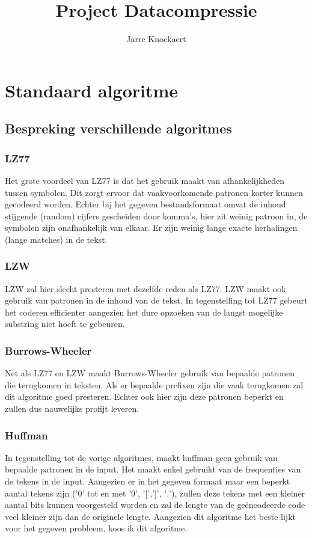 \documentclass[11pt, a4paper]{article}
\begin{document}
	\title{Project Datacompressie}
	\author{Jarre Knockaert}
	\maketitle

\newpage

\section{Standaard algoritme}
\subsection{Bespreking verschillende algoritmes}
\subsubsection{LZ77}
Het grote voordeel van LZ77 is dat het gebruik maakt van afhankelijkheden tussen symbolen. Dit zorgt ervoor dat vaakvoorkomende patronen korter kunnen gecodeerd worden. Echter bij het gegeven bestandsformaat omvat de inhoud stijgende (random) cijfers gescheiden door komma's, hier zit weinig patroon in, de symbolen zijn onafhankelijk van elkaar. Er zijn weinig lange exacte herhalingen (lange matches) in de tekst. 

\subsubsection{LZW}
LZW zal hier slecht presteren met dezelfde reden als LZ77. LZW maakt ook gebruik van patronen in de inhoud van de tekst. In tegenstelling tot LZ77 gebeurt het coderen effic\"{i}enter aangezien het dure opzoeken van de langst mogelijke substring niet hoeft te gebeuren. 

\subsubsection{Burrows-Wheeler}
Net als LZ77 en LZW maakt Burrows-Wheeler gebruik van bepaalde patronen die terugkomen in teksten. Als er bepaalde prefixen zijn die vaak terugkomen zal dit algoritme goed presteren. Echter ook hier zijn deze patronen beperkt en zullen dus nauwelijks profijt leveren. 

\subsubsection{Huffman}
In tegenstelling tot de vorige algoritmes, maakt huffman geen gebruik van bepaalde patronen in de input. Het maakt enkel gebruikt van de frequenties van de tekens in de input. Aangezien er in het gegeven formaat maar een beperkt aantal tekens zijn ('0' tot en met '9', '[',']', ','), zullen deze tekens met een kleiner aantal bits kunnen voorgesteld worden en zal de lengte van de ge\"{e}ncodeerde code veel kleiner zijn dan de originele lengte. Aangezien dit algoritme het beste lijkt voor het gegeven probleem, koos ik dit algoritme. 
\end{document}
